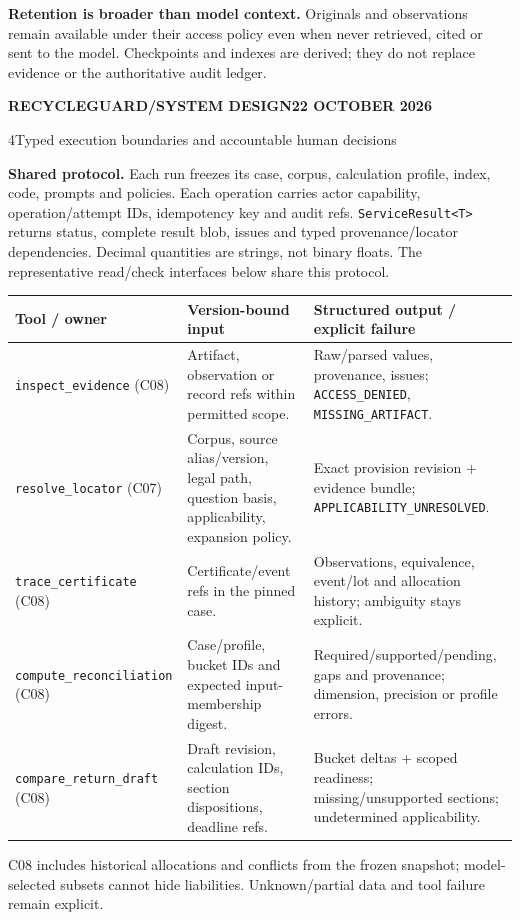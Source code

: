 \documentclass[10pt,a4paper]{article}
\newcommand{\pagehead}[2]{{\sffamily\fontsize{8}{10}\selectfont\bfseries\color{muted}RECYCLEGUARD\quad /\quad SYSTEM DESIGN\hfill 22 OCTOBER 2026}\par\vspace{3pt}{\sffamily\fontsize{20}{23}\selectfont\bfseries\color{forest}#1}\par{\sffamily\small\color{muted}#2}\par\vspace{3pt}{\color{forest}\hrule height .8pt}\vspace{3pt}}
\newcommand{\callout}[1]{\par\begingroup\setlength{\fboxsep}{7pt}\colorbox{tint}{\parbox{\dimexpr\linewidth-14pt}{#1}}\endgroup\par}
\newcommand{\code}[1]{\texttt{\small #1}}
\begin{document}
\callout{\textbf{Retention is broader than model context.} Originals and observations remain available under their access policy even when never retrieved, cited or sent to the model. Checkpoints and indexes are derived; they do not replace evidence or the authoritative audit ledger.}

\newpage
\pagehead{Tools, contracts and governance}{4\quad Typed execution boundaries and accountable human decisions}
\textbf{Shared protocol.} Each run freezes its case, corpus, calculation profile, index, code, prompts and policies. Each operation carries actor capability, operation/attempt IDs, idempotency key and audit refs. \code{ServiceResult<T>} returns status, complete result blob, issues and typed provenance/locator dependencies. Decimal quantities are strings, not binary floats. The representative read/check interfaces below share this protocol.

{\fontsize{9}{11}\selectfont
\begin{tabularx}{\linewidth}{@{}L{38mm}Y Y@{}}\toprule
\textbf{Tool / owner} & \textbf{Version-bound input} & \textbf{Structured output / explicit failure}\\\midrule
\code{inspect\_evidence} (C08) & Artifact, observation or record refs within permitted scope. & Raw/parsed values, provenance, issues; \code{ACCESS\_DENIED}, \code{MISSING\_ARTIFACT}.\\
\code{resolve\_locator} (C07) & Corpus, source alias/version, legal path, question basis, applicability, expansion policy. & Exact provision revision + evidence bundle; \code{APPLICABILITY\_UNRESOLVED}.\\
\code{trace\_certificate} (C08) & Certificate/event refs in the pinned case. & Observations, equivalence, event/lot and allocation history; ambiguity stays explicit.\\
\code{compute\_reconciliation} (C08) & Case/profile, bucket IDs and expected input-membership digest. & Required/supported/pending, gaps and provenance; dimension, precision or profile errors.\\
\code{compare\_return\_draft} (C08) & Draft revision, calculation IDs, section dispositions, deadline refs. & Bucket deltas + scoped readiness; missing/unsupported sections; undetermined applicability.\\\bottomrule
\end{tabularx}}\par
\vspace{2pt}
C08 includes historical allocations and conflicts from the frozen snapshot; model-selected subsets cannot hide liabilities. Unknown/partial data and tool failure remain explicit.
\end{document}
